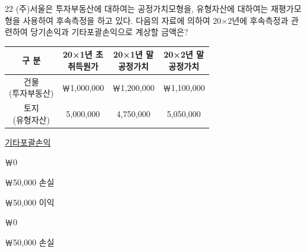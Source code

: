 \begin{question}{22}
(주)서울은 투자부동산에 대하여는 공정가치모형을, 유형자산에 대하여는 재평가모형을 사용하여 후속측정을 하고 있다. 다음의 자료에 의하여 20×2년에 후속측정과 관련하여 당기손익과 기타포괄손익으로 계상할 금액은?

{\small\centering
\begin{tabular}{|c|c|c|c|}
\hline
구 분 & \makecell{20×1년 초\\취득원가} & \makecell{20×1년 말\\공정가치} & \makecell{20×2년 말\\공정가치} \\
\hline
\makecell{건물\\(투자부동산)} & ￦1,000,000 & ￦1,200,000 & ￦1,100,000 \\
\hline
\makecell{토지\\(유형자산)} & 5,000,000 & 4,750,000 & 5,050,000 \\
\hline
\end{tabular}\par}

\noindent\hspace*{2em}\uline{기타포괄손익}\par
\begin{choices}
  \item {}￦0
  \item {}￦50,000 손실
  \item {}￦50,000 이익
  \item {}￦0
  \item {}￦50,000 손실
\end{choices}
\end{question}
